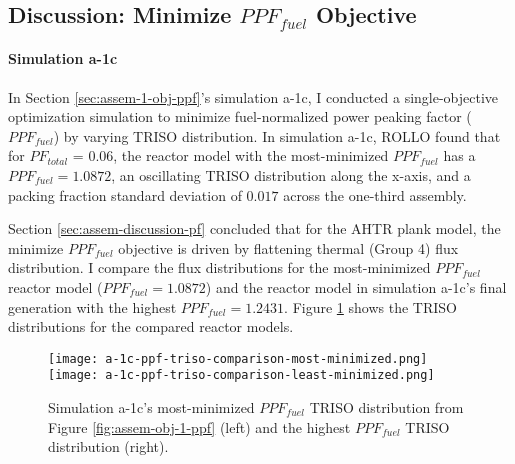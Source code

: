 \subsection{Discussion: Minimize $PPF_{fuel}$ Objective}
\label{sec:assem-discussion-ppf}
\paragraph{Simulation a-1c}
In Section \ref{sec:assem-1-obj-ppf}'s simulation a-1c, I conducted a single-objective 
optimization simulation to minimize fuel-normalized power peaking factor ($PPF_{fuel}$) 
by varying TRISO distribution. 
In simulation a-1c, \gls{ROLLO} found that for $PF_{total}$ = 0.06, the reactor model 
with the most-minimized $PPF_{fuel}$ has a $PPF_{fuel} = 1.0872$, an oscillating 
TRISO distribution along the x-axis, and a packing fraction standard deviation of 
$0.017$ across the one-third assembly. 

Section \ref{sec:assem-discussion-pf} concluded that for the \gls{AHTR} plank 
model, the minimize $PPF_{fuel}$ objective is driven by flattening thermal 
(Group 4) flux distribution. 
I compare the flux distributions for the most-minimized $PPF_{fuel}$ reactor model  
($PPF_{fuel} = 1.0872$) and the reactor model in simulation a-1c's final generation
with the highest $PPF_{fuel} = 1.2431$. 
Figure \ref{fig:a-1c-ppf-triso-comparison} shows the TRISO distributions for the 
compared reactor models. 
\begin{figure}[htbp!]
    \centering
    \texttt{[image: a-1c-ppf-triso-comparison-most-minimized.png]} 
    \texttt{[image: a-1c-ppf-triso-comparison-least-minimized.png]} 
    \caption{Simulation a-1c's most-minimized $PPF_{fuel}$ TRISO distribution 
    from Figure \ref{fig:assem-obj-1-ppf} (left) and the highest $PPF_{fuel}$ TRISO 
    distribution (right).}
    \label{fig:a-1c-ppf-triso-comparison}
\end{figure}

